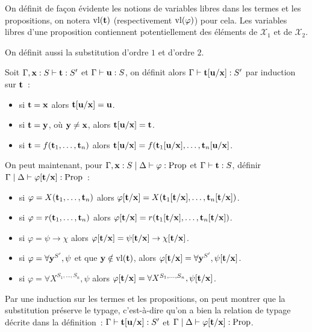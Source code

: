 \documentclass{article}
\begin{document}
On définit de façon évidente les notions de variables libres dans les termes et les propositions, on notera $\mathrm{vl}(\mathbf{t})$ (respectivement $\mathrm{vl}(\varphi)$) pour cela. Les variables libres d'une proposition contiennent potentiellement des éléments de $\mathcal X_1$ et de $\mathcal X_2$.

On définit aussi la substitution d'ordre $1$ et d'ordre $2$.

\begin{defi}
    Soit $\Gamma, \mathbf{x} : S\vdash \mathbf{t} : S'$ et $\Gamma\vdash \mathbf{u} : S$, on définit alors $\Gamma\vdash \mathbf{t}[\mathbf{u}/\mathbf{x}] : S'$ par induction sur $\mathbf{t}$~:
    \begin{itemize}
        \item si $\mathbf{t} = \mathbf{x}$ alors $\mathbf{t}[\mathbf{u}/\mathbf{x}] = \mathbf{u}$.
        \item si $\mathbf{t} = \mathbf{y}$, où $\mathbf{y} \neq \mathbf{x}$, alors $\mathbf{t}[\mathbf{u}/\mathbf{x}] = \mathbf{t}$.
        \item si $\mathbf{t} = f(\mathbf{t}_1,\ldots,\mathbf{t}_n)$ alors $\mathbf{t}[\mathbf{u}/\mathbf{x}] = f(\mathbf{t}_1[\mathbf{u}/\mathbf{x}],\ldots,\mathbf{t}_n[\mathbf{u}/\mathbf{x}]$.
    \end{itemize}
    On peut maintenant, pour $\Gamma, \mathbf{x} : S\mid\Delta\vdash \varphi : \mathrm{Prop}$ et $\Gamma\vdash \mathbf{t} : S$, définir $\Gamma\mid\Delta\vdash\varphi[\mathbf{t}/\mathbf{x}] : \mathrm{Prop}$~:
    \begin{itemize}
        \item si $\varphi = X(\mathbf{t}_1,\ldots,\mathbf{t}_n)$ alors $\varphi[\mathbf{t}/\mathbf{x}] = X(\mathbf{t}_1[\mathbf{t}/\mathbf{x}],\ldots,\mathbf{t}_n[\mathbf{t}/\mathbf{x}])$.
        \item si $\varphi = r(\mathbf{t}_1,\ldots,\mathbf{t}_n)$ alors $\varphi[\mathbf{t}/\mathbf{x}] = r(\mathbf{t}_1[\mathbf{t}/\mathbf{x}],\ldots,\mathbf{t}_n[\mathbf{t}/\mathbf{x}])$.
        \item si $\varphi = \psi \to \chi$ alors $\varphi[\mathbf{t}/\mathbf{x}] = \psi[\mathbf{t}/\mathbf{x}] \to \chi[\mathbf{t}/\mathbf{x}]$.
        \item si $\varphi = \forall \mathbf{y}^{S'}, \psi$ et que $\mathbf{y}\notin \mathrm{vl}(\mathbf{t})$, alors $\varphi[\mathbf{t}/\mathbf{x}] = \forall \mathbf{y}^{S'}, \psi[\mathbf{t}/\mathbf{x}]$.
        \item si $\varphi = \forall X^{S_1,\ldots,S_n}, \psi$ alors $\varphi[\mathbf{t}/\mathbf{x}] = \forall X^{S_1,\ldots,S_n}, \psi[\mathbf{t}/\mathbf{x}]$.
    \end{itemize}
\end{defi}

Par une induction sur les termes et les propositions, on peut montrer que la substitution préserve le typage, c'est-à-dire qu'on a bien la relation de typage décrite dans la définition~: $\Gamma\vdash \mathbf{t}[\mathbf{u}/\mathbf{x}] : S'$ et $\Gamma\mid\Delta\vdash \varphi[\mathbf{t}/\mathbf{x}] : \mathrm{Prop}$.
\end{document}
